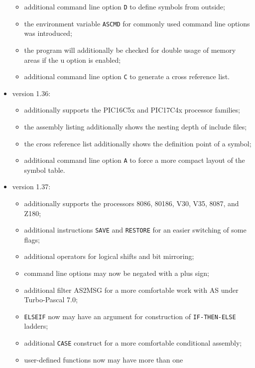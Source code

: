 \documentclass[12pt,twoside]{report}
\newcommand{\tty}[1]{{\tt #1}}
\begin{document}
\begin{itemize}
{\begin{itemize}
{            functions;}
      \item{additional command line option \tty{D} to define symbols
            from outside;}
      \item{the environment variable \tty{ASCMD} for commonly used
            command line options was introduced;}
      \item{the program will additionally be checked for double
            usage of memory areas if the u option is enabled;}
      \item{additional command line option \tty{C} to generate a cross
            reference list.}
      \end{itemize}}
\item{version 1.36:
      \begin{itemize}
      \item{additionally supports the PIC16C5x and PIC17C4x
            processor families;}
      \item{the assembly listing additionally shows the nesting
            depth of include files;}
      \item{the cross reference list additionally shows the
            definition point of a symbol;}
      \item{additional command line option \tty{A} to force a more
            compact layout of the symbol table.}
      \end{itemize}}
\item{version 1.37:
      \begin{itemize}
      \item{additionally supports the processors 8086, 80186,
            V30, V35, 8087, and Z180;}
      \item{additional instructions \tty{SAVE} and \tty{RESTORE} for an
            easier switching of some flags;}
      \item{additional operators for logical shifts and bit
            mirroring;}
      \item{command line options may now be negated with a
            plus sign;}
      \item{additional filter AS2MSG for a more comfortable
            work with AS under Turbo-Pascal 7.0;}
      \item{\tty{ELSEIF} now may have an argument for construction
            of \tty{IF\--THEN\--ELSE} ladders;}
      \item{additional \tty{CASE} construct for a more comfortable
            conditional assembly;}
      \item{user-defined functions now may have more than one
}
\end{itemize}}
\end{itemize}
\end{document}
